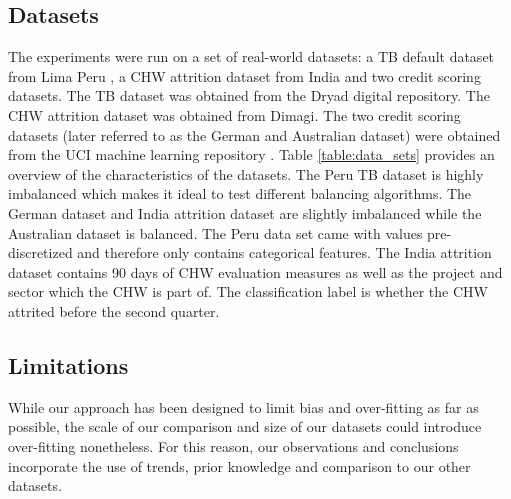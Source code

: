 \documentclass{sig-alternate-05-2015}
\begin{document}
	\subsection{Datasets}
	The experiments were run on a set of real-world datasets: a TB default dataset from Lima Peru \cite{Lackey:10356751520150601}, a CHW attrition dataset from India and two credit scoring datasets. The TB dataset was obtained from the Dryad digital repository. The CHW attrition dataset was obtained from Dimagi. The two credit scoring datasets (later referred to as the German and Australian dataset) were obtained from the UCI machine learning repository \cite{Lichman:2013}. Table \ref{table:data_sets} provides an overview of the characteristics of the datasets. The Peru TB dataset is highly imbalanced which makes it ideal to test different balancing algorithms. The German dataset and India attrition dataset are slightly imbalanced while the Australian dataset is balanced. The Peru data set came with values pre-discretized and therefore only contains categorical features. The India attrition dataset contains 90 days of CHW evaluation measures as well as the project and sector which the CHW is part of. The classification label is whether the CHW attrited before the second quarter.
	\begin{table}
		\centering
		\small
		\vspace{-3em}
		\caption{Data set summary}
		\label{table:data_sets}
		\vspace{-1em}
		\vspace{-0em}
	\end{table}

	\subsection{Limitations}
	While our approach has been designed to limit bias and over-fitting as far as possible, the scale of our comparison and size of our datasets could introduce over-fitting nonetheless. For this reason, our observations and conclusions incorporate the use of trends, prior knowledge and comparison to our other datasets. 
	
\end{document}
